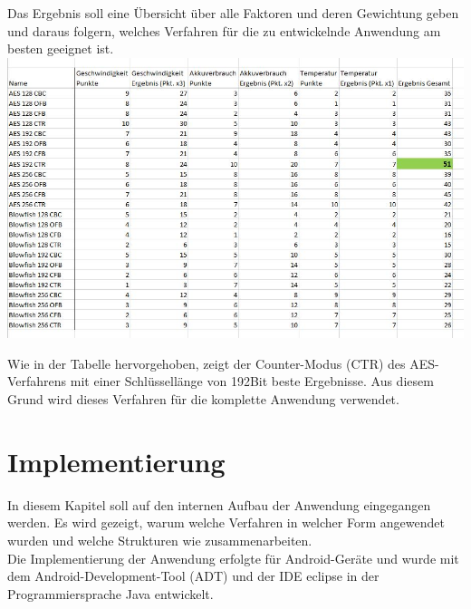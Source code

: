 \documentclass[10pt, a4paper,headsepline]{scrreprt}
\begin{document}
Das Ergebnis soll eine Übersicht über alle Faktoren und deren Gewichtung geben und daraus folgern, welches Verfahren für die zu entwickelnde Anwendung am besten geeignet ist.  \\

\includegraphics[scale=0.65]{tabelle_Cryptovergleich_einzeln.JPG}
\hfill

Wie in der Tabelle hervorgehoben, zeigt der Counter-Modus (CTR) des AES-Verfahrens mit einer Schlüssellänge von 192Bit beste Ergebnisse. Aus diesem Grund wird dieses Verfahren für die komplette Anwendung verwendet.


\chapter{Implementierung}
In diesem Kapitel soll auf den internen Aufbau der Anwendung eingegangen werden. Es wird gezeigt, warum welche Verfahren in welcher Form angewendet wurden und welche Strukturen wie zusammenarbeiten. \\
Die Implementierung der Anwendung erfolgte für Android-Geräte und wurde mit dem Android-Development-Tool (ADT) und der IDE eclipse in der Programmiersprache Java entwickelt.  
\end{document}
